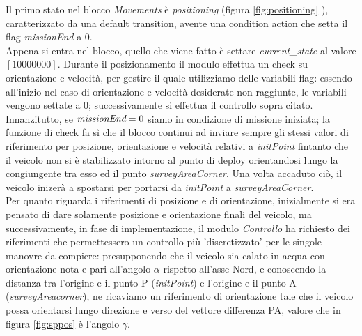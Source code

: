 \documentclass{article}
\begin{document}
            Il primo stato nel blocco \emph{Movements} è \emph{positioning} (figura \ref{fig:positioning} ), caratterizzato da una default transition, 
            avente una condition action che setta il flag \emph{missionEnd} a 0. 
            \\
            Appena si entra nel blocco, quello che viene fatto è settare \emph{current\_state} al valore $[1 0 0 0 0 0 0 0]$. 
            Durante il posizionamento il modulo effettua un check su orientazione e velocità, per gestire il quale utilizziamo delle variabili flag:
            essendo all'inizio nel caso di orientazione 
            e velocità desiderate non raggiunte, le variabili vengono settate a 0; successivamente si effettua il controllo sopra citato. Innanzitutto, se $\emph{missionEnd} = 0$
            siamo in condizione di missione iniziata; la funzione di check fa sì che il blocco continui ad inviare sempre gli stessi valori di riferimento per posizione,
            orientazione e velocità relativi a \emph{initPoint} fintanto che il veicolo non si è stabilizzato intorno al punto di deploy orientandosi lungo la congiungente
            tra esso ed il punto \emph{surveyAreaCorner}.
            Una volta accaduto ciò, il veicolo inizerà a spostarsi per portarsi da \emph{initPoint} a \emph{surveyAreaCorner}.\\
            Per quanto riguarda i riferimenti di posizione e di orientazione, inizialmente si era pensato di dare solamente posizione e orientazione finali 
            del veicolo, ma successivamente, in fase di implementazione, il modulo \textit{Controllo} ha richiesto dei riferimenti che permettessero
            un controllo più 'discretizzato' per le  singole manovre da compiere: presupponendo che il veicolo sia
            calato in acqua con orientazione nota e pari all'angolo $\alpha$ rispetto all'asse Nord, e conoscendo la distanza tra l'origine e il punto P
            (\emph{initPoint}) e l'origine e il punto A (\emph{surveyAreacorner}), ne ricaviamo un riferimento di orientazione tale che
            il veicolo possa orientarsi lungo direzione e verso del vettore differenza PA, valore che in figura \ref{fig:sppos} è l'angolo $\gamma$. 
\end{document}
